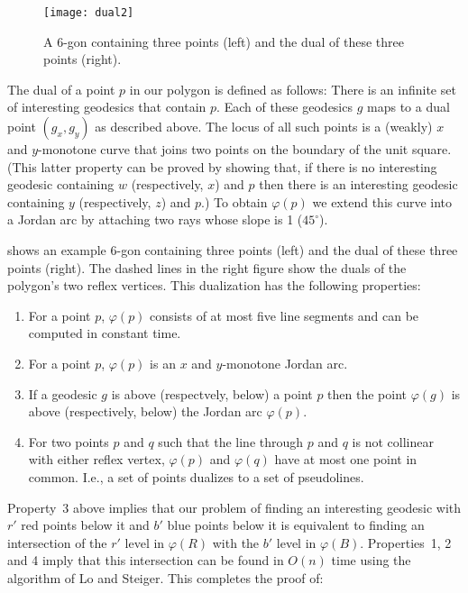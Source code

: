 \documentclass[charterfonts,lotsofwhite]{patmorin}
\newcommand{\dual}[1]{\varphi(#1)}
\begin{document}
\begin{figure*}[htbp]
\begin{center}\texttt{[image: dual2]}\end{center}
\caption{A 6-gon containing three points (left) and the dual of these
three points (right).}
\end{figure*}

The dual of a point $p$ in our polygon is defined as follows:  There
is an infinite set of interesting geodesics that contain $p$.  Each of
these geodesics $g$ maps to a dual point $(g_x,g_y)$ as described
above.  The locus of all such points is a (weakly) $x$ and
$y$-monotone curve that joins two points on the boundary of the unit
square. (This latter property can be proved by showing that, if there
is no interesting geodesic containing $w$ (respectively, $x$) and $p$
then there is an interesting geodesic containing $y$ (respectively,
$z$) and $p$.) To obtain $\dual{p}$ we extend this curve into a Jordan
arc by attaching two rays whose slope is 1 ($45^\circ$).

 shows an example 6-gon containing three points
(left) and the dual of these three points (right).  The dashed lines
in the right figure show the duals of the polygon's two reflex
vertices.  This dualization has the following properties:
\begin{enumerate}
\item For a point $p$, $\dual{p}$ consists of at most five line
segments and can be computed in constant time.

\item For a point $p$, $\dual{p}$ is an $x$ and $y$-monotone Jordan
arc. 

\item If a geodesic $g$ is above (respectvely, below) a point $p$ then
the point $\dual{g}$ is above (respectively, below) the Jordan arc
$\dual{p}$.

\item For two points $p$ and $q$ such that the line through $p$ and
$q$ is not collinear with either reflex vertex, $\dual{p}$ and
$\dual{q}$ have at most one point in common.  I.e., a set of
points dualizes to a set of pseudolines.

\end{enumerate}

Property~3 above implies that our problem of finding an interesting
geodesic with $r'$ red points below it and $b'$ blue points below it
is equivalent to finding an intersection of the $r'$ level in
$\dual{R}$ with the $b'$ level in $\dual{B}$.  Properties~1, 2 and 4
imply that this intersection can be found in $O(n)$ time using the
algorithm of Lo and Steiger.  This completes the proof of:
\end{document}
